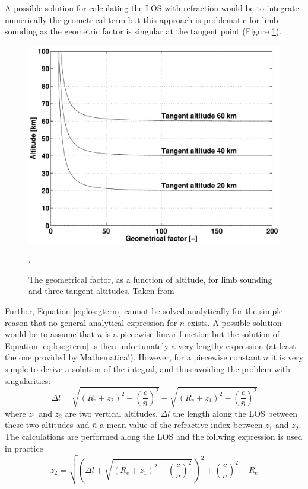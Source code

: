   A possible solution for calculating the LOS with refraction would be to 
  integrate numerically the geometrical term \citep{eriksson:00a} but 
  this approach is problematic for limb sounding as the geometric factor is
  singular at the tangent point (Figure \ref{fig:los:gfac}).
  \begin{figure}
   \begin{center}
    \includegraphics*[width=0.7\hsize]{Figs/fig_geomfac}
     \caption{The geometrical factor, as a function of altitude, for limb 
              sounding and three tangent altitudes. Taken from
              \citet{eriksson:97a}}.
    \label{fig:los:gfac}
   \end{center} 
  \end{figure}
  Further, Equation \ref{eq:los:gterm} cannot be solved analytically 
  for the simple reason that no general analytical expression for 
  $n$ exists. A possible solution would be to assume that $n$ is a
  piecewise linear function but the solution of Equation \ref{eq:los:gterm}
  is then unfortunately a very lengthy expression (at least the one provided 
  by Mathematica!). However, for a piecewise constant $n$ it is very simple
  to derive a solution of the integral, and thus avoiding the problem
  with singularities:
  \begin{equation}
    \Delta l = \sqrt{(R_e+z_2)^2 - \left( \frac{c}{\bar{n}} \right)^2} -
                     \sqrt{(R_e+z_1)^2 - \left( \frac{c}{\bar{n}} \right)^2}
  \end{equation}
  where $z_1$ and $z_2$ are two vertical altitudes, $\Delta l$ the length
  along the LOS between these two altitudes and $\bar{n}$ a mean value of
  the refractive index between $z_1$ and $z_2$. The calculations are 
  performed along the LOS and the follwing expression is used in practice
  \begin{equation}
     z_2 = \sqrt{ \left( \Delta l + 
           \sqrt{(R_e+z_1)^2 - \left( \frac{c}{\bar{n}} \right)^2}\, \right)^2
                                  + \left( \frac{c}{\bar{n}} \right)^2 } - R_e 
   \label{eq:los:refr:deltal}
  \end{equation}
